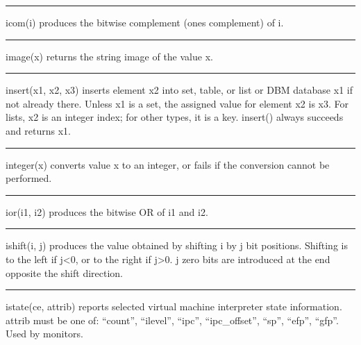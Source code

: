 \bigskip\hrule\vspace{0.1cm}

\noindent
\textsf{icom(i)} produces the bitwise complement (one{\textquotesingle}s
complement) of \textsf{i}.

\bigskip\hrule\vspace{0.1cm}

\noindent
{}\textsf{image(x)} returns the string image of the value
\textsf{x}.

\bigskip\hrule\vspace{0.1cm}

\noindent
\textsf{insert(x1, x2, x3)} inserts element \textsf{x2} into set, table,
or list or DBM database \textsf{x1} if not already there. Unless
\textsf{x1} is a set, the assigned value for element \textsf{x2} is
\textsf{x3}. For lists, \textsf{x2} is an integer index; for other
types, it is a key. \textsf{insert()} always succeeds
and returns \textsf{x1}.

\bigskip\hrule\vspace{0.1cm}

\noindent
{}\textsf{integer(x)} converts value \textsf{x}
to an integer, or fails if the conversion cannot be performed.

\bigskip\hrule\vspace{0.1cm}

\noindent
{}\textsf{ior(i1, i2)} produces the bitwise OR of
\textsf{i1} and \textsf{i2}.

\bigskip\hrule\vspace{0.1cm}

\noindent
{}\textsf{ishift(i, j)} produces the value obtained by
shifting \textsf{i} by \textsf{j} bit positions. Shifting is to the
left if \textsf{j{\textless}0}, or to the right if
\textsf{j{\textgreater}0}. \textsf{j} zero bits are introduced at the
end opposite the shift direction.

\bigskip\hrule\vspace{0.1cm}

\noindent
\textsf{istate(ce, attrib)} reports selected virtual machine interpreter
state information. \textsf{attrib} must be one of:
\textsf{{\textquotedblleft}count{\textquotedblright}},
\textsf{{\textquotedblleft}ilevel{\textquotedblright}},
\textsf{{\textquotedblleft}ipc{\textquotedblright}},
\textsf{{\textquotedblleft}ipc\_offset{\textquotedblright}},
\textsf{{\textquotedblleft}sp{\textquotedblright}},
\textsf{{\textquotedblleft}efp{\textquotedblright}},
\textsf{{\textquotedblleft}gfp{\textquotedblright}}. Used by monitors.

